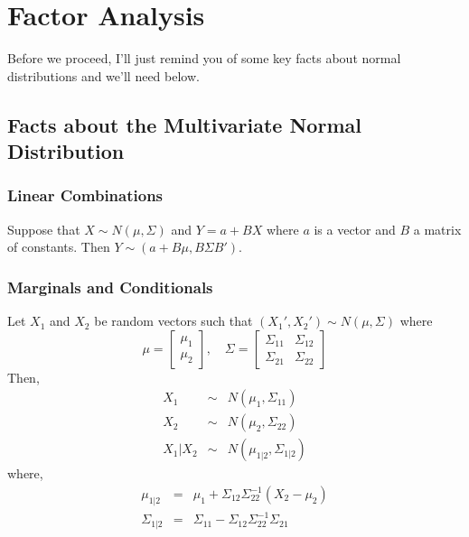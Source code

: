 \section{Factor Analysis}

Before we proceed, I'll just remind you of some key facts about normal distributions and we'll need below.

\subsection{Facts about the Multivariate Normal Distribution}
\subsubsection{Linear Combinations}
Suppose that $X \sim N(\mu, \Sigma)$ and $Y = a + BX$ where $a$ is a vector and $B$ a matrix of constants. Then $Y \sim (a + B\mu, B\Sigma B')$.
\subsubsection{Marginals and Conditionals}
Let $X_1$ and $X_2$ be random vectors such that $(X_1' , X_2') \sim N(\mu, \Sigma)$ where
	$$\mu = \left[\begin{array}{c}
		\mu_1 \\ \mu_2
	\end{array}\right], \quad \Sigma = \left[ \begin{array}{cc}
	\Sigma_{11} & \Sigma_{12}\\
	\Sigma_{21} & \Sigma_{22}
	\end{array}\right]
	$$
Then, 
	\begin{eqnarray*}
		X_1 &\sim& N(\mu_1, \Sigma_{11})\\
		X_2 &\sim& N(\mu_2, \Sigma_{22})\\
		X_1|X_2 &\sim& N(\mu_{1|2}, \Sigma_{1|2})
	\end{eqnarray*}
where,
	\begin{eqnarray*}
		\mu_{1|2} &=& \mu_1 + \Sigma_{12}\Sigma_{22}^{-1}(X_2 - \mu_2)\\
		\Sigma_{1|2} &=&\Sigma_{11} - \Sigma_{12} \Sigma_{22}^{-1} \Sigma_{21}
	\end{eqnarray*}


